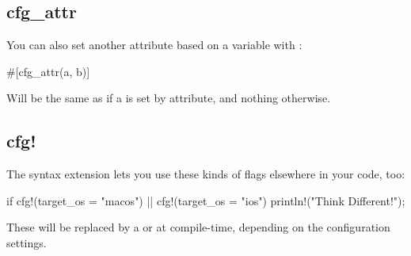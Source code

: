 \subsection*{cfg\_attr}

You can also set another attribute based on a  variable with :

\begin{rustc}
#[cfg_attr(a, b)]
\end{rustc}

Will be the same as \code{\#[b]} if a is set by  attribute, and nothing otherwise.

\subsection*{cfg!}

The  syntax extension lets you use these kinds of flags elsewhere in your code, too:

\begin{rustc}
if cfg!(target_os = "macos") || cfg!(target_os = "ios") {
    println!("Think Different!");
}
\end{rustc}

These will be replaced by a  or  at compile-time, depending on the configuration settings.
